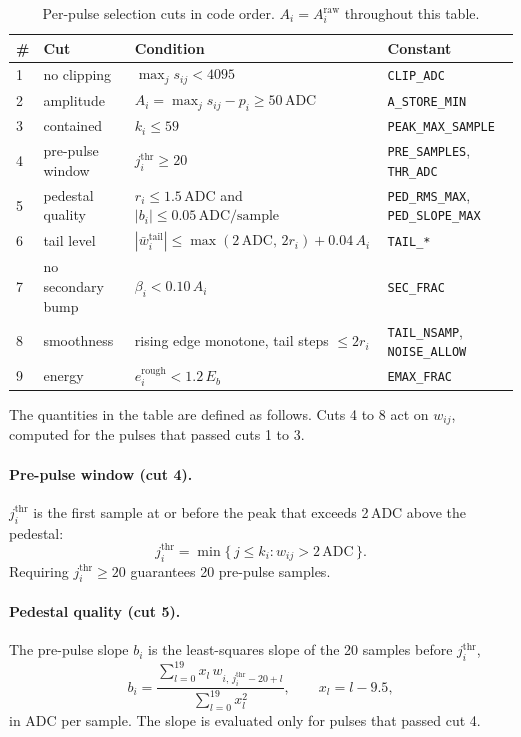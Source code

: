 \documentclass[11pt]{article}
\newcommand{\adc}{\,\mathrm{ADC}}
\newcommand{\code}[1]{\texttt{#1}}
\begin{document}
\begin{table}[htbp]
\centering
\caption{Per-pulse selection cuts in code order. $A_i = A^{\mathrm{raw}}_i$ throughout this table.}
\label{tab:cuts}
\small
\begin{tabular}{llll}
\toprule
\# & Cut & Condition & Constant \\
\midrule
1 & no clipping & $\max_j s_{ij} < 4095$ & \code{CLIP\_ADC} \\
2 & amplitude & $A_i = \max_j s_{ij} - p_i \ge 50\adc$ & \code{A\_STORE\_MIN} \\
3 & contained & $k_i \le 59$ & \code{PEAK\_MAX\_SAMPLE} \\
4 & pre-pulse window & $j^{\mathrm{thr}}_i \ge 20$ & \code{PRE\_SAMPLES}, \code{THR\_ADC} \\
5 & pedestal quality & $r_i \le 1.5\adc$ and $|b_i| \le 0.05\adc/\text{sample}$ & \code{PED\_RMS\_MAX}, \code{PED\_SLOPE\_MAX} \\
6 & tail level & $|\bar w^{\mathrm{tail}}_i| \le \max(2\adc,\,2r_i) + 0.04\,A_i$ & \code{TAIL\_*} \\
7 & no secondary bump & $\beta_i < 0.10\,A_i$ & \code{SEC\_FRAC} \\
8 & smoothness & rising edge monotone, tail steps $\le 2 r_i$ & \code{TAIL\_NSAMP}, \code{NOISE\_ALLOW} \\
9 & energy & $e^{\mathrm{rough}}_i < 1.2\,E_b$ & \code{EMAX\_FRAC} \\
\bottomrule
\end{tabular}
\end{table}

The quantities in the table are defined as follows. Cuts 4 to 8 act on $w_{ij}$, computed for the pulses that passed cuts 1 to 3.

\paragraph{Pre-pulse window (cut 4).} $j^{\mathrm{thr}}_i$ is the first sample at or before the peak that exceeds 2\,ADC above the pedestal:
\begin{equation}
j^{\mathrm{thr}}_i = \min\{\, j \le k_i : w_{ij} > 2\adc \,\}.
\end{equation}
Requiring $j^{\mathrm{thr}}_i \ge 20$ guarantees 20 pre-pulse samples.

\paragraph{Pedestal quality (cut 5).} The pre-pulse slope $b_i$ is the least-squares slope of the 20 samples before $j^{\mathrm{thr}}_i$,
\begin{equation}
b_i = \frac{\sum_{l=0}^{19} x_l\, w_{i,\,j^{\mathrm{thr}}_i - 20 + l}}{\sum_{l=0}^{19} x_l^2},
\qquad x_l = l - 9.5,
\end{equation}
in ADC per sample. The slope is evaluated only for pulses that passed cut 4.
\end{document}
